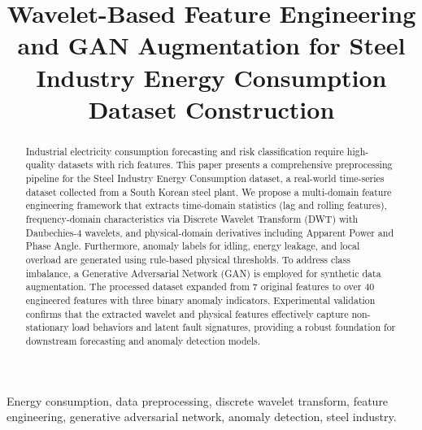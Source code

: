 \documentclass[conference]{IEEEtran}
\begin{document}
\title{Wavelet-Based Feature Engineering and GAN Augmentation 
for Steel Industry Energy Consumption Dataset Construction}

\author{
}

\maketitle

\begin{abstract}
Industrial electricity consumption forecasting and risk 
classification require high-quality datasets with rich features. 
This paper presents a comprehensive preprocessing pipeline for 
the Steel Industry Energy Consumption dataset, a real-world 
time-series dataset collected from a South Korean steel plant. 
We propose a multi-domain feature engineering framework that 
extracts time-domain statistics (lag and rolling features), 
frequency-domain characteristics via Discrete Wavelet Transform 
(DWT) with Daubechies-4 wavelets, and physical-domain derivatives 
including Apparent Power and Phase Angle. Furthermore, anomaly 
labels for idling, energy leakage, and local overload are 
generated using rule-based physical thresholds. To address class 
imbalance, a Generative Adversarial Network (GAN) is employed 
for synthetic data augmentation. The processed dataset expanded 
from 7 original features to over 40 engineered features with 
three binary anomaly indicators. Experimental validation confirms 
that the extracted wavelet and physical features effectively 
capture non-stationary load behaviors and latent fault 
signatures, providing a robust foundation for downstream 
forecasting and anomaly detection models.
\end{abstract}

\begin{IEEEkeywords}
Energy consumption, data preprocessing, discrete wavelet 
transform, feature engineering, generative adversarial network, 
anomaly detection, steel industry.
\end{IEEEkeywords}
\end{document}
